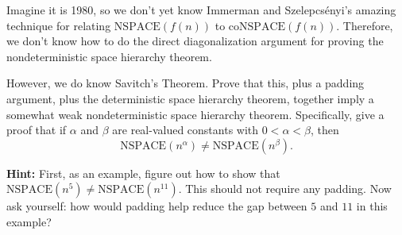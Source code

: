 \documentclass[12pt]{article}
\begin{document}



\begin{problem}{1}
Imagine it is 1980, so we don’t yet know Immerman and Szelepcsényi’s amazing technique for relating $\mathrm{NSPACE}(f(n))$
to $\mathrm{coNSPACE}(f(n))$. Therefore, we don’t know how to do the direct diagonalization argument for proving the nondeterministic space hierarchy theorem.

However, we do know Savitch’s Theorem. Prove that this, plus a padding argument, plus the deterministic space hierarchy
theorem, together imply a somewhat weak nondeterministic space hierarchy theorem. Specifically, give a proof that if $\alpha$
and $\beta$ are real-valued constants with $0 < \alpha < \beta$, then
\[
\mathrm{NSPACE}(n^\alpha) \neq \mathrm{NSPACE}(n^\beta).
\]

\textbf{Hint:} First, as an example, figure out how to show that $\mathrm{NSPACE}(n^5) \neq \mathrm{NSPACE}(n^{11})$. This should not require any padding. Now ask yourself: how would padding help reduce the gap between $5$ and $11$ in this example?
\end{problem}
\end{document}

